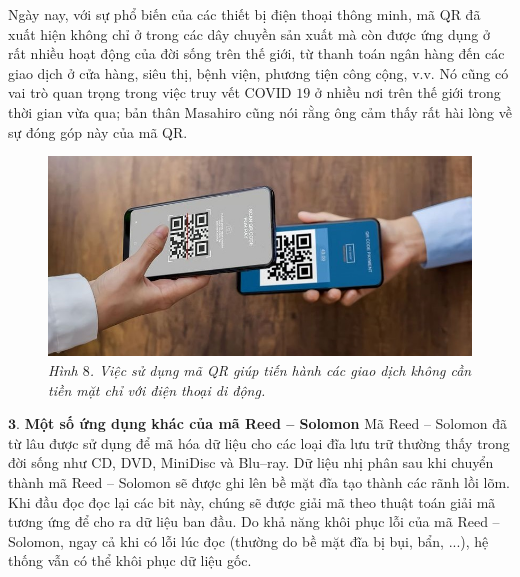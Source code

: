 \begin{multicols}{2}
\begin{figure}[H]
		\vspace*{-10pt}
	\end{figure}
	Ngày nay, với sự phổ biến của các thiết bị điện thoại thông minh, mã QR đã xuất hiện không chỉ ở trong các dây chuyền sản xuất mà còn được ứng dụng ở rất nhiều hoạt động của đời sống trên thế giới, từ thanh toán ngân hàng đến các giao dịch ở cửa hàng, siêu thị, bệnh viện, phương tiện công cộng, v.v. Nó cũng có vai trò quan trọng trong việc truy vết COVID $19$ ở nhiều nơi trên thế giới trong thời gian vừa qua; bản thân Masahiro cũng nói rằng ông cảm thấy rất hài lòng về sự đóng góp này của mã QR.
	\begin{figure}[H]
		\vspace*{-5pt}
		\centering
		\captionsetup{labelformat= empty, justification=centering}
		\includegraphics[width= 1\linewidth]{16}
		\caption{\small\textit{\color{toanhocdoisong}Hình $8$. Việc sử dụng mã QR giúp tiến hành các giao dịch không cần tiền mặt chỉ với điện thoại di động.}}
		\vspace*{-10pt}
	\end{figure}
	$\pmb{3.}$ \textbf{\color{toanhocdoisong}\color{toanhocdoisong}Một số ứng dụng khác của mã Reed -- Solomon}
	\vskip 0.05cm
	Mã Reed -- Solomon đã từ lâu được sử dụng để mã hóa dữ liệu cho các loại đĩa lưu trữ thường thấy trong đời sống như CD, DVD, MiniDisc và Blu--ray. Dữ liệu nhị phân sau khi chuyển thành mã Reed -- Solomon sẽ được ghi lên bề mặt đĩa tạo thành các rãnh lồi lõm. Khi đầu đọc đọc lại các bit này, chúng sẽ được giải mã theo thuật toán giải mã tương ứng để cho ra dữ liệu ban đầu. Do khả năng khôi phục lỗi của mã Reed -- Solomon, ngay cả khi có lỗi lúc đọc (thường do bề mặt đĩa bị bụi, bẩn, ...), hệ thống vẫn có thể khôi phục dữ liệu gốc.
	\begin{figure}[H]
		\vspace*{-5pt}
		\centering
		\captionsetup{labelformat= empty, justification=centering}

\end{figure}
\end{multicols}
